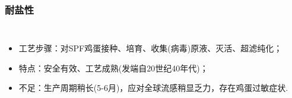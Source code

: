 \documentclass[10pt,aspectratio=43,mathserif]{beamer}
\begin{document}
\begin{frame}
\frametitle{耐盐性}
\begin{columns}[c]
\begin{itemize}
    \item 工艺步骤：对SPF鸡蛋接种、培育、收集(病毒)原液、灭活、超滤纯化；
    \item 特点：安全有效、工艺成熟(发端自20世纪40年代)；
    \item 不足：生产周期稍长(5-6月)，应对全球流感稍显乏力，存在鸡蛋过敏症状.
\end{itemize}
\end{columns}
\end{frame}
\end{document}
